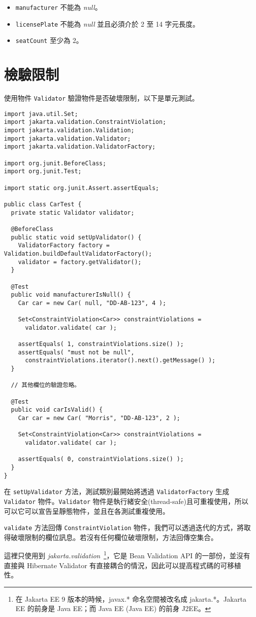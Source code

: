 \begin{itemize}
\item \texttt{manufacturer} 不能為 \textit{null}。
\item \texttt{licensePlate} 不能為 \textit{null} 並且必須介於 2 至 14 字元長度。
\item \texttt{seatCount} 至少為 2。
\end{itemize}

\section{檢驗限制}

使用物件 \texttt{Validator} 驗證物件是否破壞限制，以下是單元測試。

\begin{lstlisting}
import java.util.Set;
import jakarta.validation.ConstraintViolation;
import jakarta.validation.Validation;
import jakarta.validation.Validator;
import jakarta.validation.ValidatorFactory;

import org.junit.BeforeClass;
import org.junit.Test;

import static org.junit.Assert.assertEquals;

public class CarTest {
  private static Validator validator;

  @BeforeClass
  public static void setUpValidator() {
    ValidatorFactory factory = Validation.buildDefaultValidatorFactory();
    validator = factory.getValidator();
  }

  @Test
  public void manufacturerIsNull() {
    Car car = new Car( null, "DD-AB-123", 4 );

    Set<ConstraintViolation<Car>> constraintViolations =
      validator.validate( car );

    assertEquals( 1, constraintViolations.size() );
    assertEquals( "must not be null",
      constraintViolations.iterator().next().getMessage() );
  }

  // 其他欄位的驗證忽略。

  @Test
  public void carIsValid() {
    Car car = new Car( "Morris", "DD-AB-123", 2 );

    Set<ConstraintViolation<Car>> constraintViolations =
      validator.validate( car );

    assertEquals( 0, constraintViolations.size() );
  }
}
\end{lstlisting}

在 \texttt{setUpValidator} 方法，測試類別最開始將透過 \texttt{ValidatorFactory} 生成 \texttt{Validator} 物件。\texttt{Validator} 物件是執行緒安全(thread-safe)且可重複使用，所以可以它可以宣告呈靜態物件，並且在各測試重複使用。

\texttt{validate} 方法回傳 \texttt{ConstraintViolation} 物件，我們可以透過迭代的方式，將取得破壞限制的欄位訊息。若沒有任何欄位破壞限制，方法回傳空集合。

這裡只使用到 \textit{jakarta.validation}~\footnote{在 Jakarta EE 9 版本的時候，javax.* 命名空間被改名成 jakarta.*。Jakarta EE 的前身是 Java EE；而 Java EE (Java EE) 的前身 J2EE。}，它是 Bean Validation API 的一部份，並沒有直接與 Hibernate Validator 有直接耦合的情況，因此可以提高程式碼的可移植性。